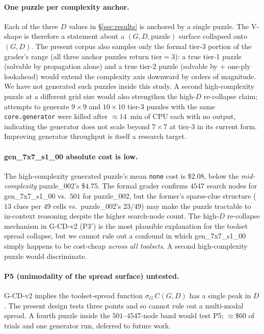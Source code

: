 \documentclass[11pt,letterpaper]{article}
\begin{document}
\paragraph{One puzzle per complexity anchor.} Each of the three
$D$ values in \S\ref{sec:results} is anchored by a single puzzle.
The V-shape is therefore a statement about a $(G, D, \text{puzzle})$
surface collapsed onto $(G, D)$. The present corpus also samples
only the formal tier-3 portion of the grader's range (all three
anchor puzzles return $\text{tier} = 3$): a true tier-1 puzzle
(solvable by propagation alone) and a true tier-2 puzzle
(solvable by $+$ one-ply lookahead) would extend the complexity
axis downward by orders of magnitude. We have not generated such
puzzles inside this study. A second high-complexity puzzle at a
different grid size would also strengthen the high-$D$
re-collapse claim; attempts to generate $9 \times 9$ and
$10 \times 10$ tier-3 puzzles with the same
\texttt{core.generator} were killed after ${\approx}14$~min of CPU
each with no output, indicating the generator does not scale
beyond $7 \times 7$ at tier-3 in its current form. Improving
generator throughput is itself a research target.

\paragraph{gen\_7x7\_s1\_00 absolute cost is low.}
The high-complexity generated puzzle's mean \texttt{none} cost is
\$$2.08$, below the \emph{mid-complexity} puzzle\_002's \$$4.75$.
The formal grader confirms $4547$ search nodes for
gen\_7x7\_s1\_00 vs.\ $501$ for puzzle\_002, but the former's
sparse-clue structure ($13$ clues per $49$ cells vs.\ puzzle\_002's
$23/49$) may make the puzzle tractable to in-context reasoning
despite the higher search-node count. The high-$D$ re-collapse
mechanism in G-CD-v2 (\textsc{P3$'$}) is the most plausible
explanation for the toolset spread collapse, but we cannot rule
out a confound in which gen\_7x7\_s1\_00 simply happens to be
cost-cheap \emph{across all toolsets}. A second high-complexity
puzzle would discriminate.

\paragraph{\textsc{P5} (unimodality of the spread surface)
untested.} G-CD-v2 implies the toolset-spread function
$\sigma_G\, C(G, D)$ has a single peak in $D$. The present design
tests three points and so cannot rule out a multi-modal spread. A
fourth puzzle inside the $501$--$4547$-node band would test
\textsc{P5}; ${\approx}\$60$ of trials and one generator run,
deferred to future work.
\end{document}
